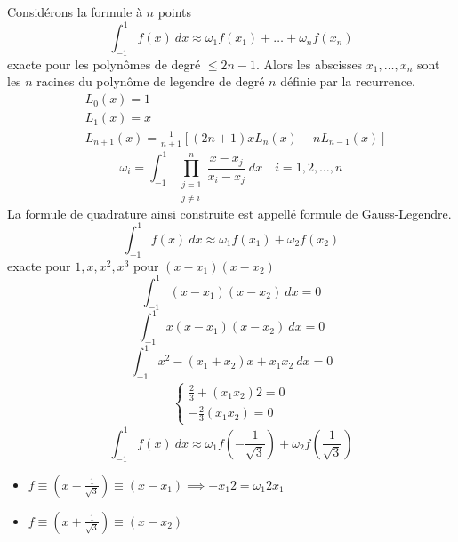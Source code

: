 \begin{prop}
   Considérons la formule à $n$ points
   \[
   \int_{{-1}}^{{1}} {f(x)} \: d{x} \approx \omega_1f(x_1) + \ldots + \omega_nf(x_n)
   \] 
   exacte pour les polynômes de degré $\le 2n - 1$. Alors les abscisses $x_1, \ldots, x_n$ sont les $n$ racines du polynôme de legendre de degré  $n$ définie par la recurrence.
    \begin{align*}
       &L_0(x) = 1\\
       &L_1(x) = x\\
       &L_{n+1}(x) = \frac{1}{n+1}\left[ (2n + 1)xL_n(x) - nL_{n-1}(x) \right] 
   \end{align*}
   \[
       \omega_i = \int_{{-1}}^{{1}} {\prod_{\substack{j=1 \\ j \neq i}}^{n} \frac{x - x_j}{x_i - x_j} } \: d{x} {} \quad i = 1, 2, \ldots, n
   \] 
   La formule de quadrature ainsi construite est appellé formule de Gauss-Legendre.
   \[
   \int_{{-1}}^{{1}} {f(x)} \: d{x} \approx \omega_1f(x_1) + \omega_2f(x_2)
   \] 
   exacte pour $1, x, x^2, x^3$ pour  $(x - x_1)(x - x_2)$
   \[
   \int_{{-1}}^{{1}} {(x - x_1)(x - x_2)} \: d{x} {= 0}
   \] 
   \[
   \int_{{-1}}^{{1}} {x(x - x_1)(x - x_2)} \: d{x} {= 0}
   \] 
   \[
   \int_{{-1}}^{{1}} {x^2 - (x_1 + x_2)x + x_1x_2} \: d{x} {= 0}
   \] 
   \begin{align*}
       \begin{cases}
           \frac{2}{3} + (x_1x_2)2 = 0\\
           -\frac{2}{3}(x_1x_2) = 0
       \end{cases}
   \end{align*}
   \[
   \int_{{-1}}^{{1}} {f(x)} \: d{x} {\approx \omega_1f(-\frac{1}{\sqrt{3} })} + \omega_2 f(\frac{1}{\sqrt{3} })
   \] 
   \begin{itemize}
       \item $f \equiv (x - \frac{1}{\sqrt{3} }) \equiv (x - x_1) \implies -x_{1}2 = \omega_1 2 x_1$
       \item $f \equiv (x + \frac{1}{\sqrt{3} }) \equiv (x - x_{2}) $
   \end{itemize}
\end{prop}
